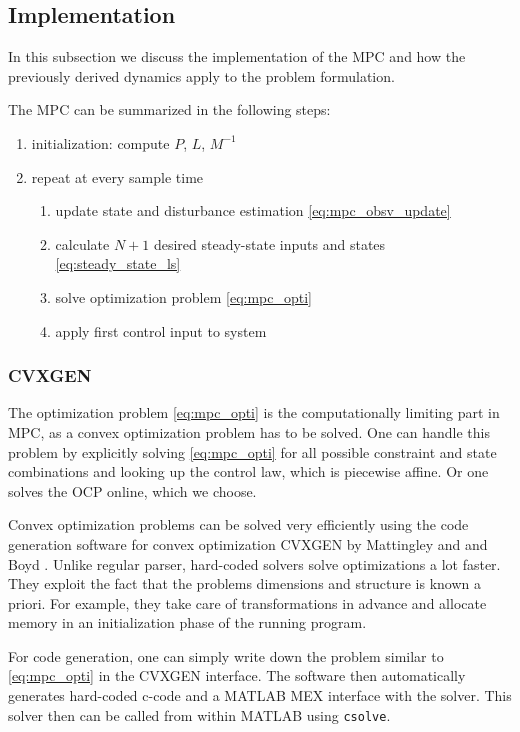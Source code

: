 \subsection{Implementation}
In this subsection we discuss the implementation of the MPC and how the previously derived dynamics apply to the problem formulation.

The MPC can be summarized in the following steps:
\begin{enumerate}
\item initialization: compute $P$, $L$, $M^{-1}$
\item repeat at every sample time
\begin{enumerate}
\item update state and disturbance estimation \ref{eq:mpc_obsv_update} \label{enum:mpc_start}
\item calculate $N+1$ desired steady-state inputs and states \ref{eq:steady_state_ls}
\item solve optimization problem \ref{eq:mpc_opti}
\item apply first control input to system \label{enum:mpc_finish}
\end{enumerate}
\end{enumerate}

\subsubsection{CVXGEN}
The optimization problem \ref{eq:mpc_opti} is the computationally limiting part in MPC, as a convex optimization problem has to be solved. One can handle this problem by explicitly solving \ref{eq:mpc_opti} for all possible constraint and state combinations and looking up the control law, which is piecewise affine. Or one solves the OCP online, which we choose.

Convex optimization problems can be solved very efficiently using the code generation software for convex optimization CVXGEN by Mattingley and and Boyd \cite{Mattingley2010}. Unlike regular parser, hard-coded solvers solve optimizations a lot faster. They exploit the fact that the problems dimensions and structure is known a priori. For example, they take care of transformations in advance and allocate memory in an initialization phase of the running program.

For code generation, one can simply write down the problem similar to \ref{eq:mpc_opti} in the CVXGEN interface. The software then automatically generates hard-coded c-code and a MATLAB MEX interface with the solver. This solver then can be called from within MATLAB using \texttt{csolve}.

